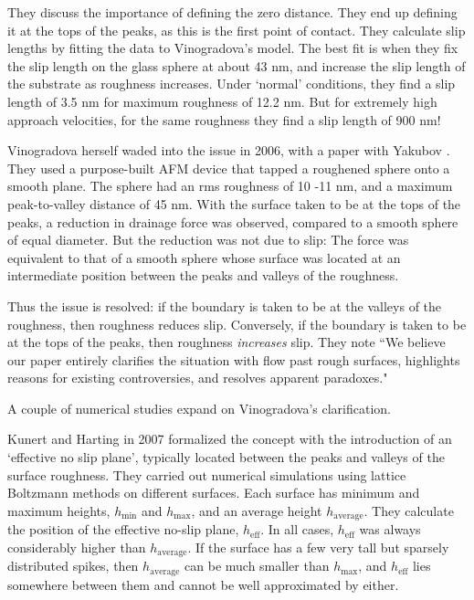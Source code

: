 \documentclass[12pt, a4paper, twoside, openright]{book}
\begin{document}
They discuss the importance of defining the zero distance.  They end up defining it at the tops of the peaks, as this is the first point of contact.  They calculate slip lengths by fitting the data to Vinogradova's model.  The best fit is when they fix the slip length on the glass sphere at about 43 nm, and increase the slip length of the substrate as roughness increases.  Under `normal' conditions, they find a slip length of 3.5 nm for maximum roughness of 12.2 nm.  But for extremely high approach velocities, for the same roughness they find a slip length of 900 nm!

Vinogradova herself waded into the issue in 2006, with a paper with Yakubov \cite{VinogradovaYakubov2006}.  They used a purpose-built AFM device that tapped a roughened sphere onto a smooth plane.  The sphere had an rms roughness of 10 -11 nm, and a maximum peak-to-valley distance of 45 nm.  With the surface taken to be at the tops of the peaks, a reduction in drainage force was observed, compared to a smooth sphere of equal diameter.  But the reduction was not due to slip:  The force was equivalent to that of a smooth sphere whose surface was located at an intermediate position between the peaks and valleys of the roughness.

Thus the issue is resolved: if the boundary is taken to be at the valleys of the roughness, then roughness reduces slip.  Conversely, if the boundary is taken to be at the tops of the peaks, then roughness \emph{increases} slip.
They note ``We believe our paper entirely clarifies the situation with flow past rough surfaces, highlights reasons for existing controversies, and resolves apparent paradoxes." 

A couple of numerical studies expand on Vinogradova's clarification.

Kunert and Harting in 2007 \cite{KunertHarting2007} formalized the concept with the introduction of an `effective no slip plane', typically located between the peaks and valleys of the surface roughness.  They carried out numerical simulations using lattice Boltzmann methods on different surfaces.  Each surface has minimum and maximum heights, $h_{\mathrm{min}}$ and $h_{\mathrm{max}}$, and an average height $h_{\mathrm{average}}$.  They calculate the position of the effective no-slip plane, $h_{\mathrm{eff}}$.  In all cases, $h_{\mathrm{eff}}$ was always considerably higher than $h_{\mathrm{average}}$.  If the surface has a few very tall but sparsely distributed spikes, then $h_{\mathrm{average}}$ can be much smaller than $h_{\mathrm{max}}$, and $h_{\mathrm{eff}}$ lies somewhere between them and cannot be well approximated by either.
\end{document}
